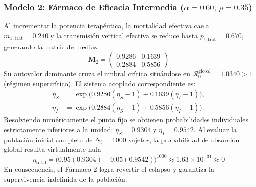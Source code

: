 \documentclass[graybox]{SNmult}
\begin{document}
	\subsubsection{Modelo 2: Fármaco de Eficacia Intermedia ($\alpha = 0.60, \, \rho = 0.35$)}
	Al incrementar la potencia terapéutica, la mortalidad efectiva cae a $m_{1,\text{trat}} = 0.240$ y la transmisión vertical efectiva se reduce hasta $p_{1,\text{trat}} = 0.670$, generando la matriz de medias:
	\begin{equation}
		\mathbf{M}_2 = \begin{pmatrix}
			0.9286 & 0.1639 \\
			0.2884 & 0.5856
		\end{pmatrix}
	\end{equation}
	Su autovalor dominante cruza el umbral crítico situándose en $\mathcal{R}_0^{\text{global}} = 1.0340 > 1$ (régimen supercrítico). El sistema acoplado correspondiente es:
	\begin{align}
		\eta_S &= \exp\Big( 0.9286(\eta_S - 1) + 0.1639(\eta_I - 1) \Big), \\
		\eta_I &= \exp\Big( 0.2884(\eta_S - 1) + 0.5856(\eta_I - 1) \Big).
	\end{align}
	Resolviendo numéricamente el punto fijo se obtienen probabilidades individuales estrictamente inferiores a la unidad: $\eta_S = 0.9304$ y $\eta_I = 0.9542$. Al evaluar la población inicial completa de $N_0 = 1000$ sujetos, la probabilidad de absorción global resulta virtualmente nula:
	\begin{equation}
		\eta_{\text{total}} = \big( 0.95(0.9304) + 0.05(0.9542) \big)^{1000} \approx 1.63 \times 10^{-31} \approx 0
	\end{equation}
	En consecuencia, el Fármaco 2 logra revertir el colapso y garantiza la supervivencia indefinida de la población.
	
\end{document}
